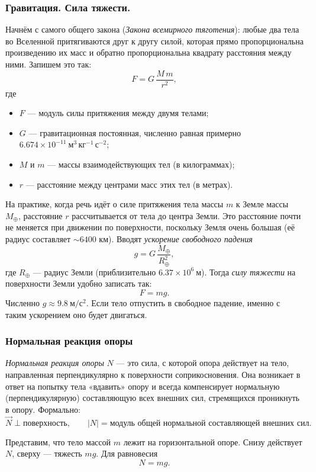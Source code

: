 \documentclass[12pt, a4paper]{article}%
\begin{document}
\subsubsection*{Гравитация. Сила тяжести.}
Начнём с самого общего закона (\textit{Закона всемирного тяготения}): любые два тела во Вселенной притягиваются друг к другу силой, которая прямо пропорциональна 
произведению их масс и обратно пропорциональна квадрату расстояния между ними. Запишем это так:
\[
F = G \,\frac{M\,m}{r^2},
\]
где
\begin{itemize}
  \item $F$ — модуль силы притяжения между двумя телами;
  \item $G$ — гравитационная постоянная, численно равная примерно $6{.}674\times10^{-11}\ \mathrm{м^3\,кг^{-1}\,с^{-2}}$;
  \item $M$ и $m$ — массы взаимодействующих тел (в килограммах);
  \item $r$ — расстояние между центрами масс этих тел (в метрах).
\end{itemize}
На практике, когда речь идёт о силе притяжения тела массы $m$ к Земле массы $M_{\oplus}$, расстояние $r$ рассчитывается от тела до центра Земли.
Это расстояние почти не меняется при движении по поверхности, поскольку Земля очень большая (её радиус составляет $\sim 6400$ км). Вводят \textit{ускорение свободного падения}
\[
g = G\,\frac{M_{\oplus}}{R_{\oplus}^2},
\]
где $R_{\oplus}$ — радиус Земли (приблизительно $6{.}37\times10^6\ \mathrm{м}$). Тогда \textit{силу тяжести} на поверхности Земли удобно записать так:
\[
F = mg.
\]
Численно $g\approx9{.}8\ \mathrm{м/с^2}$. Если тело отпустить в свободное падение, именно с таким ускорением оно будет двигаться.

\subsubsection*{Нормальная реакция опоры}
\textit{Нормальная реакция опоры} $N$ — это сила, с которой опора действует на тело, направленная перпендикулярно к поверхности соприкосновения. Она возникает в ответ на попытку тела «вдавить» опору и всегда компенсирует нормальную (перпендикулярную) составляющую всех внешних сил, стремящихся проникнуть в опору. Формально:
\[
\vec N \perp \text{поверхность}, 
\qquad
|\!N\!| = \text{модуль общей нормальной составляющей внешних сил}.
\]

Представим, что тело массой $m$ лежит на горизонтальной опоре. Снизу действует $N$, сверху — тяжесть $m g$. Для равновесия
\[
N = mg.
\]
\end{document}
